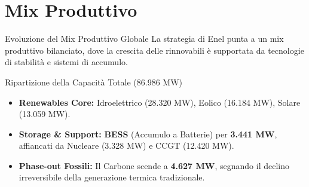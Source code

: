 
\section{Mix Produttivo}

\begin{frame}{Evoluzione del Mix Produttivo Globale}
    La strategia di Enel punta a un mix produttivo bilanciato, dove la crescita delle rinnovabili è supportata da tecnologie di stabilità e sistemi di accumulo.
    \vspace{0.1cm}
    

    \begin{block}{Ripartizione della Capacità Totale (86.986 MW)}
        \begin{itemize}
            \item \textbf{Renewables Core:} Idroelettrico (28.320 MW), Eolico (16.184 MW), Solare (13.059 MW).
            \pause
            
            \item \textbf{Storage \& Support:} \textbf{BESS} (Accumulo a Batterie) per \textbf{3.441 MW}, affiancati da Nucleare (3.328 MW) e CCGT (12.420 MW).
            \pause
            
            \item \textbf{Phase-out Fossili:} Il Carbone scende a \textbf{4.627 MW}, segnando il declino irreversibile della generazione termica tradizionale.
        \end{itemize}
    \end{block}
\end{frame}



